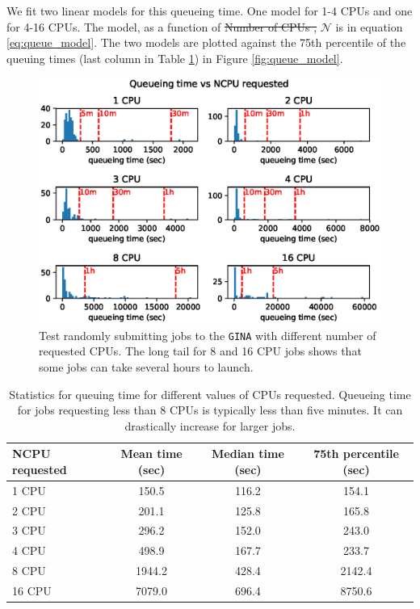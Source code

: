 \documentclass[preprint,5p]{elsarticle}
\providecommand{\DIFadd}[1]{{\protect\color{blue}\uwave{#1}}} %
\providecommand{\DIFdel}[1]{{\protect\color{red}\sout{#1}}}                      %
\providecommand{\DIFaddbegin}{} %
\providecommand{\DIFaddend}{} %
\providecommand{\DIFdelbegin}{} %
\providecommand{\DIFdelend}{} %
\newcommand{\DIFscaledelfig}{0.5}
\newlength{\DIFdelgraphicswidth} %
\newlength{\DIFdelgraphicsheight} %
\newcommand{\DIFaddincludegraphics}[2][]{{\color{blue}\fbox{\DIFOincludegraphics[#1]{#2}}}} %
\newcommand{\DIFdelincludegraphics}[2][]{%
\sbox{\DIFdelgraphicsbox}{\DIFOincludegraphics[#1]{#2}}%
\settoboxwidth{\DIFdelgraphicswidth}{\DIFdelgraphicsbox} %
\settoboxtotalheight{\DIFdelgraphicsheight}{\DIFdelgraphicsbox} %
\scalebox{\DIFscaledelfig}{%
\parbox[b]{\DIFdelgraphicswidth}{\usebox{\DIFdelgraphicsbox}\\[-\baselineskip] \rule{\DIFdelgraphicswidth}{0em}}\llap{\resizebox{\DIFdelgraphicswidth}{\DIFdelgraphicsheight}{%
\setlength{\unitlength}{\DIFdelgraphicswidth}%
\begin{picture}(1,1)%
\thicklines\linethickness{2pt} %
{\color[rgb]{1,0,0}\put(0,0){\framebox(1,1){}}}%
{\color[rgb]{1,0,0}\put(0,0){\line( 1,1){1}}}%
{\color[rgb]{1,0,0}\put(0,1){\line(1,-1){1}}}%
\end{picture}%
}\hspace*{3pt}}} %
} %
\DeclareRobustCommand{\DIFaddbegin}{\DIFOaddbegin \let\includegraphics\DIFaddincludegraphics} %
\DeclareRobustCommand{\DIFaddend}{\DIFOaddend \let\includegraphics\DIFOincludegraphics} %
\DeclareRobustCommand{\DIFdelbegin}{\DIFOdelbegin \let\includegraphics\DIFdelincludegraphics} %
\DeclareRobustCommand{\DIFdelend}{\DIFOaddend \let\includegraphics\DIFOincludegraphics} %
\begin{document}
We fit two linear models for this queueing time. One model for 1-4 CPUs and one for 4-16 CPUs. The model, as a function of \DIFdelbegin \DIFdel{Number of CPUs , }\DIFdelend \DIFaddbegin \DIFadd{the number of CPUs }\DIFaddend $\mathcal{N}$ is in equation \ref{eq:queue_model}. The two models are plotted against the 75th percentile of the queuing times (last column in Table \ref{table:queueing_stats}) in Figure \ref{fig:queue_model}.

\begin{figure}
    \includegraphics[width=0.95\linewidth]{figures/Queue_NCPU.eps}
      \caption{Test randomly submitting jobs to the \texttt{GINA} with different number of requested CPUs. The long tail for 8 and 16 CPU jobs shows that some jobs can take several hours to launch.  }

	\label{fig:queue_NCPU}
\end{figure}


\begin{table}[t]
\centering
\begin{tabular}{||p{2.8cm}|c | c | c||} 
 \hline
 NCPU requested & Mean time (sec) & Median time (sec) & 75th percentile (sec)\\ [0.5ex]
 \hline
 1 CPU & 150.5   & 116.2 & 154.1   \\ 
 2 CPU & 201.1 & 125.8 & 165.8 \\
 3 CPU & 296.2 & 152.0 & 243.0 \\
 4 CPU & 498.9 & 167.7 & 233.7\\
 8 CPU & 1944.2 & 428.4 & 2142.4\\
 16 CPU & 7079.0 & 696.4 & 8750.6\\
 \hline
\end{tabular}
\caption{Statistics for queuing time for different values of CPUs requested. Queueing time for jobs requesting less than 8 CPUs is typically less than five minutes. It can drastically increase for larger jobs. }
\label{table:queueing_stats}
\end{table}
\end{document}
